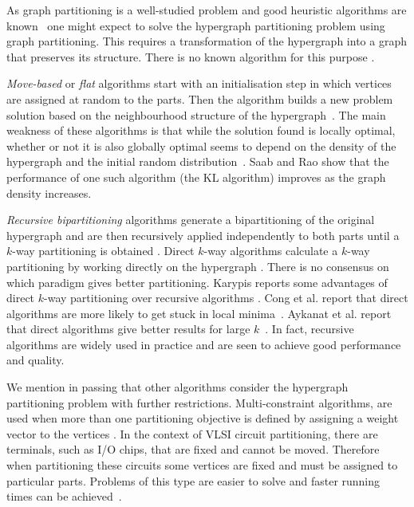 \documentclass[twocolumn]{svjour3}          \smartqed
\begin{document}
As graph partitioning is a well-studied problem and good heuristic algorithms are known~\cite{fjall1998graphsurvey} one might expect to solve the hypergraph partitioning problem using graph partitioning. This requires a transformation of the hypergraph into a graph that preserves its structure. There is no known algorithm for this purpose \cite{ihler1993}.

\textit{Move-based} or \textit{flat} algorithms start with an initialisation step in which vertices are assigned at random to the parts. Then the algorithm builds a new problem solution based on the neighbourhood structure of the hypergraph~\cite{fm1982,san1989kfm}. The main weakness of these algorithms is that while the solution found is locally optimal, whether or not it is also globally optimal seems to depend on the density of the hypergraph and the initial random distribution~\cite{goldberg1983}. Saab and Rao \cite{saab1992rao} show that the performance of one such algorithm (the KL algorithm) improves as the graph density increases.


\textit{Recursive bipartitioning} algorithms generate a bipartitioning of the original hypergraph and are then recursively applied independently to both parts until a $k$-way partitioning is obtained \cite{fm1982,ccatalyurek2011patoh,devetal2006}. {Direct $k$-way} algorithms calculate a $k$-way partitioning by working directly on the hypergraph \cite{san1989kfm}. There is no consensus on which paradigm gives better partitioning. Karypis reports some advantages of direct {$k$-way} partitioning over recursive algorithms \cite{karytech2002}. Cong et al.  report that direct algorithms are more likely to get stuck in local minima~\cite{cong1998}. Aykanat et al.  report that direct algorithms give better results for large $k$~\cite{aykanat2008fixed}. In fact, recursive algorithms are widely used in practice and are seen to achieve good performance and quality. 

We mention in passing that other algorithms consider the hypergraph partitioning problem with further restrictions. Multi-constraint algorithms, are used when more than one partitioning objective is defined by assigning a weight vector to the vertices \cite{aykanat2008fixed}.   In the context of VLSI circuit partitioning, there are terminals, such as I/O chips, that are fixed and cannot be moved. Therefore when partitioning these circuits some vertices are fixed and must be assigned to particular parts. Problems of this type are easier to solve and faster running times can be achieved~\cite{alpert2000fixed,ccatalyurek2011patoh,aykanat2008fixed}. 
\end{document}
